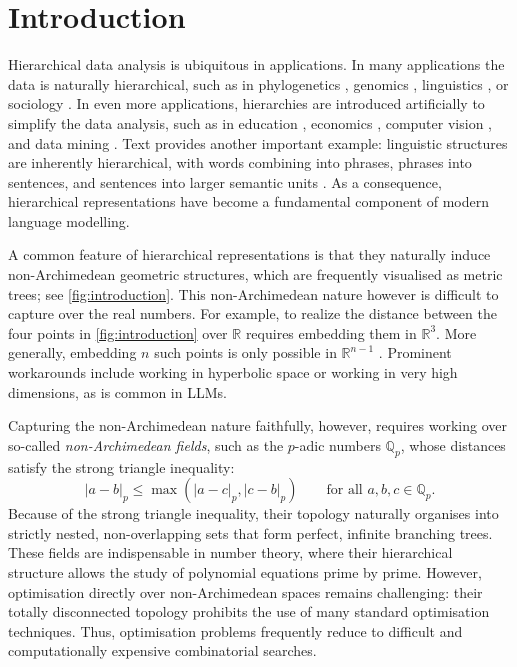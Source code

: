 \documentclass[10pt]{article}
\theoremstyle{definition}
\newcommand{\RR}{\mathbb{R}}
\newcommand{\QQ}{\mathbb{Q}}
\begin{document}

\section{Introduction}
\label{sec:intro}

Hierarchical data analysis is ubiquitous in applications.  In many applications the data is naturally hierarchical, such as in phylogenetics \cite{SKSW2003,ChakerianHolmes2012}, genomics \cite{LZH2008}, linguistics \cite{BrennanHale2019}, or sociology \cite{BryanJenkins2016}.  In even more applications, hierarchies are introduced artificially to simplify the data analysis, such as in education \cite{Raudenbush1988}, economics \cite{EDKHDM2013}, computer vision \cite{MPSKPM2022}, and data mining \cite{SillaFreitas2011}. Text provides another important example: linguistic structures are inherently hierarchical, with words combining into phrases, phrases into sentences, and sentences into larger semantic units \cite[e.g.,][]{miller1995wordnet}. As a consequence, hierarchical representations have become a fundamental component of modern language modelling.

A common feature of hierarchical representations is that they naturally induce non-Archimedean geometric structures, which are frequently visualised as metric trees; see \cref{fig:introduction}. This non-Archimedean nature however is difficult to capture over the real numbers.  For example, to realize the distance between the four points in \cref{fig:introduction} over $\RR$ requires embedding them in $\RR^3$.  More generally, embedding $n$ such points is only possible in $\RR^{n-1}$ \cite{FAVER_KOCHALSKI_MURUGAN_VERHEGGEN_WESSON_WESTON_2014}.  Prominent workarounds include working in hyperbolic space \cite{NickelKiela2017} or working in very high dimensions, as is common in LLMs.

Capturing the non-Archimedean nature faithfully, however, requires working over so-called \emph{non-Archimedean fields}, such as the $p$-adic numbers $\QQ_p$, whose distances satisfy the strong triangle inequality:
\begin{equation*}
  |a-b|_p\leq\max(|a-c|_p, |c-b|_p) \qquad\text{for all } a,b,c\in\QQ_p.
\end{equation*}
Because of the strong triangle inequality, their topology naturally organises into strictly nested, non-overlapping sets that form perfect, infinite branching trees. These fields are indispensable in number theory, where their hierarchical structure allows the study of polynomial equations prime by prime.  However, optimisation directly over non-Archimedean spaces remains challenging: their totally disconnected topology prohibits the use of many standard optimisation techniques. Thus, optimisation problems frequently reduce to difficult and computationally expensive combinatorial searches.
\end{document}
